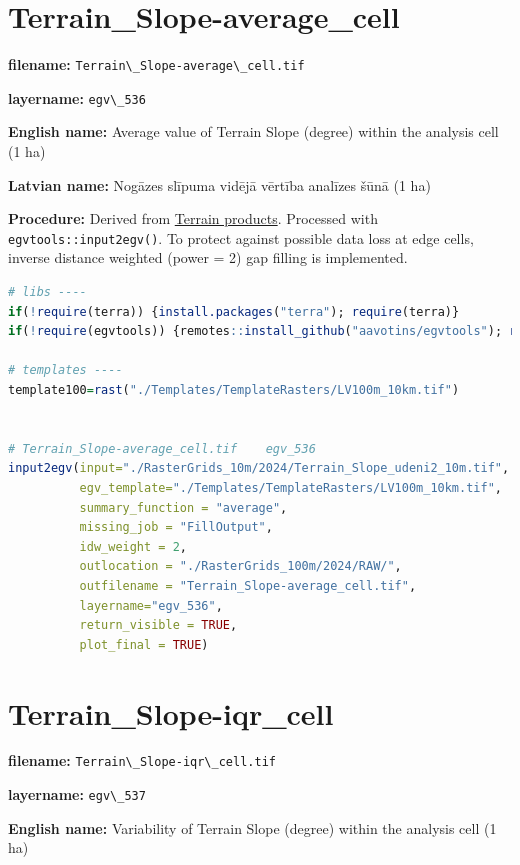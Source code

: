 \documentclass[
]{book}
\newcommand{\passthrough}[1]{#1}
\begin{document}
\section{Terrain\_Slope-average\_cell}\label{ch06.536}

\textbf{filename:} \passthrough{\lstinline!Terrain\_Slope-average\_cell.tif!}

\textbf{layername:} \passthrough{\lstinline!egv\_536!}

\textbf{English name:} Average value of Terrain Slope (degree) within the analysis cell (1 ha)

\textbf{Latvian name:} Nogāzes slīpuma vidējā vērtība analīzes šūnā (1 ha)

\textbf{Procedure:} Derived from \hyperref[Ch05.01]{Terrain products}. Processed
with \passthrough{\lstinline!egvtools::input2egv()!}. To protect against
possible data loss at edge cells, inverse distance weighted (power = 2) gap filling
is implemented.

\begin{lstlisting}[language=R]
# libs ----
if(!require(terra)) {install.packages("terra"); require(terra)}
if(!require(egvtools)) {remotes::install_github("aavotins/egvtools"); require(egvtools)}

# templates ----
template100=rast("./Templates/TemplateRasters/LV100m_10km.tif")


# Terrain_Slope-average_cell.tif    egv_536
input2egv(input="./RasterGrids_10m/2024/Terrain_Slope_udeni2_10m.tif",
          egv_template="./Templates/TemplateRasters/LV100m_10km.tif",
          summary_function = "average",
          missing_job = "FillOutput",
          idw_weight = 2,
          outlocation = "./RasterGrids_100m/2024/RAW/",
          outfilename = "Terrain_Slope-average_cell.tif",
          layername="egv_536",
          return_visible = TRUE,
          plot_final = TRUE)
\end{lstlisting}

\section{Terrain\_Slope-iqr\_cell}\label{ch06.537}

\textbf{filename:} \passthrough{\lstinline!Terrain\_Slope-iqr\_cell.tif!}

\textbf{layername:} \passthrough{\lstinline!egv\_537!}

\textbf{English name:} Variability of Terrain Slope (degree) within the analysis cell (1 ha)
\end{document}
